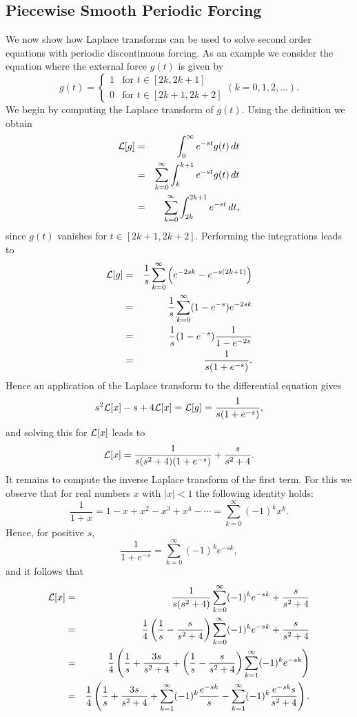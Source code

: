 \documentclass{ximera}
\begin{document}
\subsection*{Piecewise Smooth Periodic Forcing}

We now show how Laplace transforms can be used to solve second order
equations with periodic discontinuous forcing.  As an example we consider
the equation  where the external force $g(t)$ is
given by
\begin{equation}
g(t) =  
\left\{\begin{array}{cl} 1 & \mbox{for $t \in [2k,2k+1]$} \\ 
		0 & \mbox{for $t \in [2k+1,2k+2]$} \end{array} \right.
(k=0,1,2,\ldots).
\end{equation}
We begin by computing the Laplace transform of $g(t)$. Using the 
definition we obtain
\begin{eqnarray*}
{\cal L}[g] & = & \int_0^\infty e^{-st} g(t)\, dt\\
&=& \sum_{k=0}^\infty \int_k^{k+1} e^{-st} g(t)\, dt\\
&=& \sum_{k=0}^\infty \int_{2k}^{2k+1} e^{-st}\, dt,
\end{eqnarray*}
since $g(t)$ vanishes for $t \in [2k+1,2k+2]$. Performing the
integrations leads to
\begin{eqnarray*}
{\cal L}[g] & = & \frac{1}{s}\sum_{k=0}^\infty \left(e^{-2sk}-e^{-s(2k+1)}\right)\\
&=& \frac{1}{s}\sum_{k=0}^\infty (1-e^{-s})e^{-2sk}\\
&=& \frac{1}{s} (1-e^{-s}) \frac{1}{1-e^{-2s}}\\
&=& \frac{1}{s(1+e^{-s})}.
\end{eqnarray*}
Hence an application of the Laplace transform to the differential equation 
 gives
\[
s^2{\cal L}[x]-s + 4{\cal L}[x] = {\cal L}[g] = \frac{1}{s(1+e^{-s})},
\]
and solving this for ${\cal L}[x]$ leads to
\[
{\cal L}[x] = \frac{1}{s(s^2 +4)(1+e^{-s})} + \frac{s}{s^2 +4}.
\]
It remains to compute the inverse Laplace transform 
of the first term.  For this
we observe that for real numbers $x$ with $|x|<1$ the following identity holds:
\[
\frac{1}{1+x} = 1-x+x^2-x^3+x^4-\cdots = \sum_{k=0}^\infty (-1)^k x^k.
\]
Hence, for positive $s$,
\[
\frac{1}{1+e^{-s}} = \sum_{k=0}^\infty (-1)^k e^{-sk},
\]
and it follows that
\begin{eqnarray*}
{\cal L}[x] &=&\frac{1}{s(s^2 +4)}\sum_{k=0}^\infty (-1)^k e^{-sk} + \frac{s}{s^2 +4}\\
&=& \frac{1}{4}\left(\frac{1}{s}-\frac{s}{s^2+4}\right)
    \sum_{k=0}^\infty (-1)^k e^{-sk} + \frac{s}{s^2 +4}\\
&=& \frac{1}{4}\left(\frac{1}{s}+\frac{3s}{s^2+4}+
   \left(\frac{1}{s}-\frac{s}{s^2+4}\right) \sum_{k=1}^\infty (-1)^k e^{-sk}\right)\\
&=& \frac{1}{4}\left(\frac{1}{s}+\frac{3s}{s^2+4}+
   \sum_{k=1}^\infty (-1)^k \frac{e^{-sk}}{s}-
   \sum_{k=1}^\infty (-1)^k \frac{e^{-sk}s}{s^2+4}\right).
\end{eqnarray*} 
\end{document}
